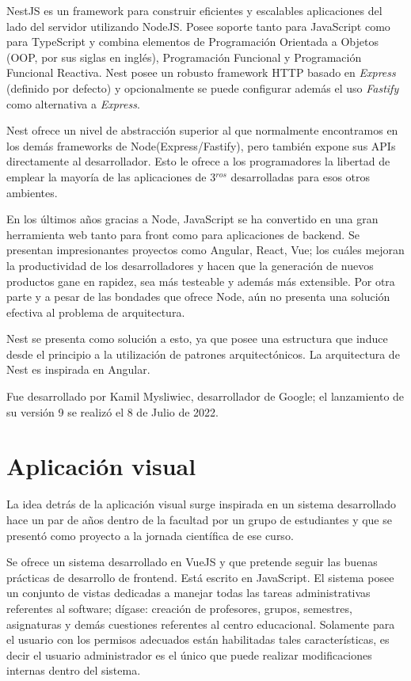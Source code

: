\cite{nestjs_doc}
NestJS es un framework para construir eficientes y escalables aplicaciones del lado del servidor utilizando NodeJS. Posee soporte tanto para JavaScript como para TypeScript y combina elementos de Programación Orientada a Objetos (OOP, por sus siglas en inglés), Programación Funcional y Programación Funcional Reactiva. Nest posee un robusto framework HTTP basado en \textit{Express} (definido por defecto) y opcionalmente se puede configurar además el uso \textit{Fastify} como alternativa a \textit{Express}.

Nest ofrece un nivel de abstracción superior al que normalmente encontramos en los demás frameworks de Node(Express/Fastify), pero también expone sus APIs directamente al desarrollador. Esto le ofrece a los programadores la libertad de emplear la mayoría de las aplicaciones de 3$^{ros}$ desarrolladas para esos otros ambientes.

En los últimos años gracias a Node, JavaScript se ha convertido en una gran herramienta web tanto para front como para aplicaciones de backend. Se presentan impresionantes proyectos como Angular, React, Vue; los cuáles mejoran la productividad de los desarrolladores y hacen que la generación de nuevos productos gane en rapidez, sea más testeable y además más extensible. Por otra parte y a pesar de las bondades que ofrece Node, aún no presenta una solución efectiva al problema de arquitectura. 

Nest se presenta como solución a esto, ya que posee una estructura que induce desde el principio a la utilización de patrones arquitectónicos. La arquitectura de Nest es inspirada en Angular.

Fue desarrollado por Kamil Mysliwiec, desarrollador de Google; el lanzamiento de su versión 9 se realizó el 8 de Julio de 2022.

\section{Aplicación visual}

La idea detrás de la aplicación visual surge inspirada en un sistema desarrollado hace un par de años dentro de la facultad por un grupo de estudiantes y que se presentó como proyecto a la jornada científica de ese curso. 

Se ofrece un sistema desarrollado en VueJS y que pretende seguir las buenas prácticas de desarrollo de frontend. Está escrito en JavaScript. El sistema posee un conjunto de vistas dedicadas a manejar todas las tareas administrativas referentes al software; dígase: creación de profesores, grupos, semestres, asignaturas y demás cuestiones referentes al centro educacional. Solamente para el usuario con los permisos adecuados están habilitadas tales características, es decir el usuario administrador es el único que puede realizar modificaciones internas dentro del sistema.

